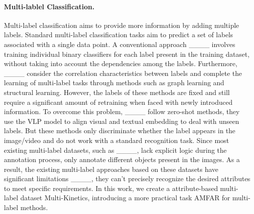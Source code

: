 \paragraph{Multi-lablel Classification.}
Multi-label classification aims to provide more information by adding multiple labels. Standard multi-label classification tasks aim to predict a set of labels associated with a single data point. A conventional approach ____ involves training individual binary classifiers for each label present in the training dataset, without taking into account the dependencies among the labels.
Furthermore, ____ consider the correlation characteristics between labels and complete the learning of multi-label tasks through methods such as graph learning and structural learning. However, the labels of these methods are fixed and still require a significant amount of retraining when faced with newly introduced information. To overcome this problem, ____ follow zero-shot methods, they use the VLP model to align visual and textual embedding to deal with unseen labels. But these methods only discriminate whether the label appears in the image/video and do not work with a standard recognition task. Since most existing multi-label datasets, such as ____, lack explicit logic during the annotation process, only annotate different objects present in the images. As a result, the existing multi-label approaches based on these datasets have significant limitations ____, they can't precisely recognize the desired attributes to meet specific requirements. In this work, we create a attribute-based multi-label dataset Multi-Kinetics, introducing a more practical task AMFAR for multi-label methods.



